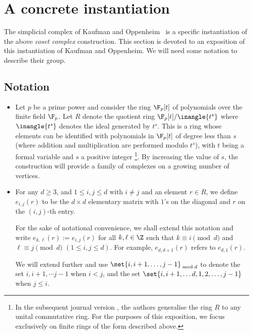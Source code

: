 \documentclass{toc}
\begin{document}
\section{A concrete instantiation}

The simplicial complex of Kaufman and Oppenheim~\cite[See STOC version]{KaufmanO2018} is
a specific instantiation of the above \emph{coset complex}
construction. This section is devoted to an exposition of this
instantiation of Kaufman and Oppenheim.  We will need some notation to
describe their group.


\subsection*{Notation}

\begin{itemize}
\item %
  Let $p$ be a prime power and consider the ring $\F_p[t]$ of polynomials
  over the finite field $\F_p$.  %
  Let $R$ denote the
  quotient %
  ring %
  $\F_p[t]/\inangle{t^s}$  %
  where $\inangle{t^s}$ denotes the ideal generated by $t^s$.  %
  This is a ring whose elements can be identified with polynomials in
  $\F_p[t]$ of degree less than $s$ (where addition and multiplication
  are performed modulo $t^s$), with 
%
%
%
%
%
$t$ being a formal variable and $s$ a positive integer%
%
 \footnote{In the subsequent journal version \cite{KaufmanO2018}, the authors generalise
 the ring $R$ to any unital commutative ring. For the %
purposes  %
of this exposition, we focus exclusively on
finite  %
rings of the form described above.}.
%
%
%
%
%
By increasing the value of $s$, the construction will provide a family of complexes
on
a %
growing number of vertices. 
%


\item For any $d\geq 3$, and $1\leq i,j\leq d$ with $i \neq j$ and an
 element $r \in R$,
  we define  $e_{i,j}(r)$ to be the $d\times d$ elementary matrix with $1$'s 
on the diagonal and $r$ on the $(i,j)$-th entry.

For the sake of notational convenience, we shall
%
%
extend this notation 
  and %
write  %
%
%
$e_{k,\ell}(r):=e_{i,j}(r)$ for all $k,\ell\in\Z$ such that 
$k\equiv i\pmod{d}$ and $\ell\equiv j\pmod{d}$ $(1\le i,j\le d)$. %
%
For example, $e_{d,d+1}(r)$ refers to $e_{d,1}(r)$.

%
We will extend further and use $\set{i,i+1, \ldots, j-1}_{\bmod d}$ to denote
the set ${i,i+1, \cdots j-1}$ when $i < j$, and the set 
$\set{i, i+1, \ldots d, 1, 2, \ldots, j-1}$ when $j \leq i$. 
\end{itemize}
\end{document}

